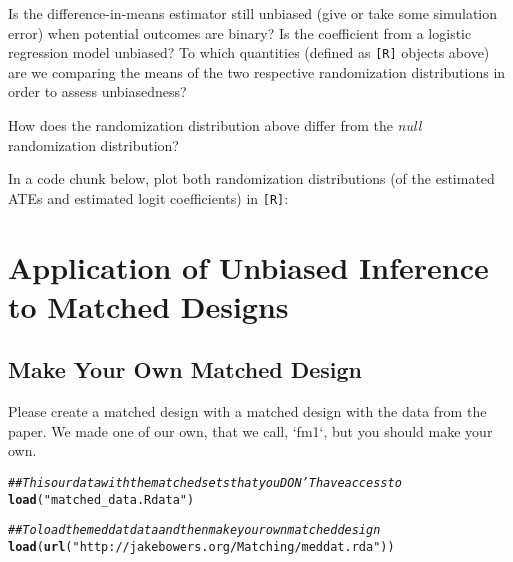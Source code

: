 \documentclass[11pt,leqno]{article}\usepackage[]{graphicx}\usepackage[]{color}
\makeatletter
\newcommand{\hlstr}[1]{\textcolor[rgb]{0.192,0.494,0.8}{#1}}%
\newcommand{\hlcom}[1]{\textcolor[rgb]{0.678,0.584,0.686}{\textit{#1}}}%
\newcommand{\hlstd}[1]{\textcolor[rgb]{0.345,0.345,0.345}{#1}}%
\newcommand{\hlkwd}[1]{\textcolor[rgb]{0.737,0.353,0.396}{\textbf{#1}}}%
\newenvironment{kframe}{%
 \def\at@end@of@kframe{}%
 \ifinner\ifhmode%
  \def\at@end@of@kframe{\end{minipage}}%
  \begin{minipage}{\columnwidth}%
 \fi\fi%
 \def\FrameCommand##1{\hskip\@totalleftmargin \hskip-\fboxsep
 \colorbox{shadecolor}{##1}\hskip-\fboxsep
     \hskip-\linewidth \hskip-\@totalleftmargin \hskip\columnwidth}%
 \MakeFramed {\advance\hsize-\width
   \@totalleftmargin\z@ \linewidth\hsize
   \@setminipage}}%
 {\par\unskip\endMakeFramed%
 \at@end@of@kframe}
\newenvironment{knitrout}{}{} %
\theoremstyle{newstyle}
\makeatother
\begin{document}
Is the difference-in-means estimator still unbiased (give or take some simulation error) when potential outcomes are binary? Is the coefficient from a logistic regression model unbiased? To which quantities (defined as \texttt{[R]} objects above) are we comparing the means of the two respective randomization distributions in order to assess unbiasedness?

How does the randomization distribution above differ from the \textit{null} randomization distribution?

In a code chunk below, plot both randomization distributions (of the estimated ATEs and estimated logit coefficients) in \texttt{[R]}:



\section{Application of Unbiased Inference to Matched Designs}

\subsection{Make Your Own Matched Design}

Please create a matched design with a matched design with the data from the
\citet{cerdaetal2012} paper. We made one of our own, that we call, `fm1`, but
you should make your own.

\begin{knitrout}\footnotesize
{}\color{fgcolor}\begin{kframe}
\begin{alltt}
\hlcom{## This our data with the matched sets that you DON'T have access to}
\hlkwd{load}\hlstd{(}\hlstr{"matched_data.Rdata"}\hlstd{)}
\end{alltt}
\end{kframe}
\end{knitrout}

\begin{knitrout}\footnotesize
{}\color{fgcolor}\begin{kframe}
\begin{alltt}
\hlcom{## To load the meddat data and then make your own matched design}
\hlkwd{load}\hlstd{(}\hlkwd{url}\hlstd{(}\hlstr{"http://jakebowers.org/Matching/meddat.rda"}\hlstd{))}
\end{alltt}
\end{kframe}
\end{knitrout}
\end{document}
